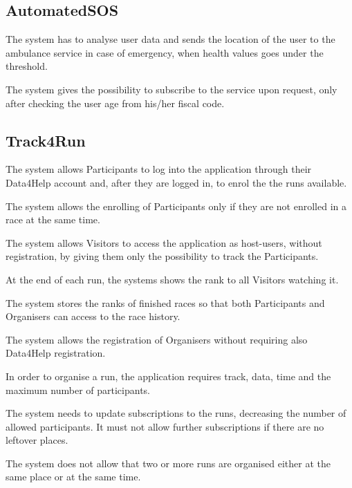 \subsection{AutomatedSOS}

\begin{enumerate}[label={[}R2.\arabic*{]}]

    \item The system has to analyse user data and sends the location of the user to the ambulance service in case of emergency, when health values goes under the threshold.
    
    \item The system gives the possibility to subscribe to the service upon request, only after checking the user age from his/her fiscal code.
\end{enumerate}


\subsection{Track4Run}

\begin{enumerate}[label={[}R3.\arabic*{]}]

    \item The system allows Participants to log into the application through their Data4Help account and, after they are logged in, to enrol the the runs available.
    
    \item The system allows the enrolling of Participants only if they are not enrolled in a race at the same time.
    
    \item The system allows Visitors to access the application as host-users, without registration, by giving them only the possibility to track the Participants.
    
    \item At the end of each run, the systems shows the rank to all Visitors watching it.
    
    \item The system stores the ranks of finished races so that both Participants and Organisers can access to the race history.
    
    \item The system allows the registration of Organisers without requiring also Data4Help registration.
    
    \item In order to organise a run, the application requires track, data, time and the maximum number of participants.
    
    \item The system needs to update subscriptions to the runs, decreasing the number of allowed participants. It must not allow further subscriptions if there are no leftover places.
    
    \item The system does not allow that two or more runs are organised either at the same place or at the same time.

\end{enumerate}